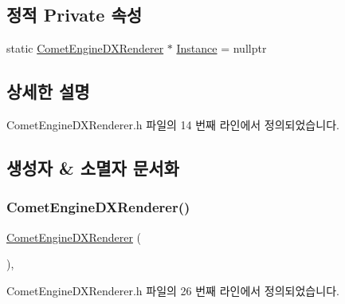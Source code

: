 \subsection*{정적 Private 속성}
\begin{DoxyCompactItemize}
\item 
static \hyperlink{class_comet_engine_1_1_renderer_1_1_comet_engine_d_x_renderer}{Comet\+Engine\+D\+X\+Renderer} $\ast$ \hyperlink{class_comet_engine_1_1_renderer_1_1_comet_engine_d_x_renderer_af2bbff1b1d0120cc652b4f2198ddb04a}{Instance} = nullptr
\end{DoxyCompactItemize}


\subsection{상세한 설명}


Comet\+Engine\+D\+X\+Renderer.\+h 파일의 14 번째 라인에서 정의되었습니다.



\subsection{생성자 \& 소멸자 문서화}
\mbox{\label{class_comet_engine_1_1_renderer_1_1_comet_engine_d_x_renderer_a5d4d4453042540bd1f4e4a36229b62f6}} 
\subsubsection{\texorpdfstring{Comet\+Engine\+D\+X\+Renderer()}{CometEngineDXRenderer()}}
{\footnotesize\ttfamily \hyperlink{class_comet_engine_1_1_renderer_1_1_comet_engine_d_x_renderer}{Comet\+Engine\+D\+X\+Renderer} (\begin{DoxyParamCaption}{ }\end{DoxyParamCaption})\hspace{0.3cm}{\ttfamily [inline]}, {\ttfamily [private]}}



Comet\+Engine\+D\+X\+Renderer.\+h 파일의 26 번째 라인에서 정의되었습니다.


